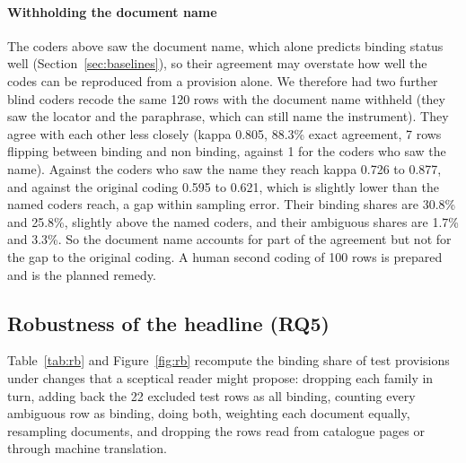 \documentclass[conference]{IEEEtran}
\begin{document}
\paragraph{Withholding the document name} The coders above saw the document name, which alone predicts binding status well (Section~\ref{sec:baselines}), so their agreement may overstate how well the codes can be reproduced from a provision alone. We therefore had two further blind coders recode the same 120 rows with the document name withheld (they saw the locator and the paraphrase, which can still name the instrument). They agree with each other less closely (kappa 0.805, 88.3\% exact agreement, 7 rows flipping between binding and non binding, against 1 for the coders who saw the name). Against the coders who saw the name they reach kappa 0.726 to 0.877, and against the original coding 0.595 to 0.621, which is slightly lower than the named coders reach, a gap within sampling error. Their binding shares are 30.8\% and 25.8\%, slightly above the named coders, and their ambiguous shares are 1.7\% and 3.3\%. So the document name accounts for part of the agreement but not for the gap to the original coding. A human second coding of 100 rows is prepared and is the planned remedy.

\subsection{Robustness of the headline (RQ5)}\label{sec:robust}
Table~\ref{tab:rb} and Figure~\ref{fig:rb} recompute the binding share of test provisions under changes that a sceptical reader might propose: dropping each family in turn, adding back the 22 excluded test rows as all binding, counting every ambiguous row as binding, doing both, weighting each document equally, resampling documents, and dropping the rows read from catalogue pages or through machine translation.
\end{document}
